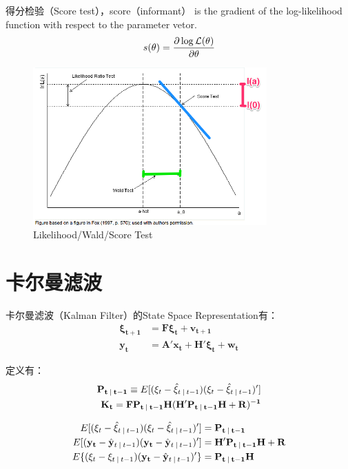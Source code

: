 \documentclass[11pt]{article}
\begin{document}
得分检验（Score test），score（informant） is the gradient of the log-likelihood function with respect to the parameter vetor.
\begin{equation*}
    s(\theta) = \frac{\partial \log \mathcal{L}(\theta)}{\partial \theta}
\end{equation*}

\begin{figure}[ht!]
    \centering
    \includegraphics[width=0.8\textwidth]{fig/W-L-S-test.png}
    \caption{Likelihood/Wald/Score Test}
\end{figure}

\section{卡尔曼滤波}

卡尔曼滤波（Kalman Filter）的State Space Representation有：
\begin{align*}
   \mathbf{\xi_{t+1}} &= \mathbf{F \xi_{t}} + \mathbf{v_{t+1}} \\
   \mathbf{y_{t}} &= \mathbf{A'} \mathbf{x_{t}} + \mathbf{H'\xi_{t}} + \mathbf{w_t}
\end{align*}

定义有：
\begin{align*}
    \mathbf{P_{t\:\vert\: t-1}} \equiv E[(\xi_{t} - \hat{\xi}_{t\:\vert\: t-1})(\xi_{t} - \hat{\xi}_{t\:\vert\: t-1})'] \\
    \mathbf{K_t} = \mathbf{FP_{t\:\vert\: t-1}H(H'P_{t\:\vert\: t-1}H+R)^{-1}}
\end{align*}

\begin{align*}
    E[(\xi_{t} - \hat{\xi}_{t\:\vert\: t-1})(\xi_{t} - \hat{\xi}_{t\:\vert\: t-1})'] &= \mathbf{P_{t\:\vert\: t-1}} \\ E[(\mathbf{y_t} - \hat{\mathbf{y}}_{t\:\vert\: t-1})(\mathbf{y_t} - \hat{\mathbf{y}}_{t\:\vert\: t-1})'] &= \mathbf{H'P_{t\:\vert\: t-1}H+R} \\
    E\{(\xi_t - \xi_{t\:\vert\: t-1})(\mathbf{y_t} - \hat{\mathbf{y}}_{t\:\vert\: t-1})'\} &= \mathbf{P_{t\:\vert\: t-1}H} \\
\end{align*}
\end{document}
